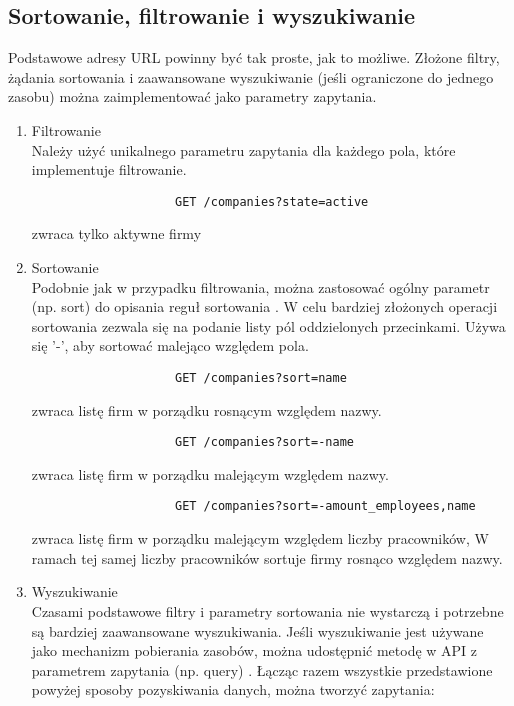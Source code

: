 	\subsection{Sortowanie, filtrowanie i wyszukiwanie}
		Podstawowe adresy URL powinny być tak proste, jak to możliwe. Złożone filtry, żądania sortowania i zaawansowane wyszukiwanie (jeśli ograniczone do jednego zasobu) można zaimplementować jako parametry zapytania.
		\begin{enumerate}
			\item{Filtrowanie} \\
				Należy użyć unikalnego parametru zapytania dla każdego pola, które implementuje filtrowanie.
				
				\begin{verbatim}
					GET /companies?state=active 
				\end{verbatim}
				zwraca tylko aktywne firmy
				
			
			\item{Sortowanie} \\
				Podobnie jak w przypadku filtrowania, można zastosować ogólny parametr (np. sort) do opisania reguł sortowania \cite{BestPracticesWeb}. W celu bardziej złożonych operacji sortowania zezwala się na podanie listy pól oddzielonych przecinkami. Używa się '-', aby sortować malejąco względem pola.
				
				\begin{verbatim}
					GET /companies?sort=name
				\end{verbatim}
				zwraca listę firm w porządku rosnącym względem nazwy. \\
				
				\begin{verbatim}
					GET /companies?sort=-name
				\end{verbatim}
				zwraca listę firm w porządku malejącym względem nazwy. \\
			
				\begin{verbatim}
					GET /companies?sort=-amount_employees,name
				\end{verbatim}
				zwraca listę firm w porządku malejącym względem liczby pracowników, W ramach tej samej liczby pracowników sortuje firmy rosnąco względem nazwy.
					
			\item{Wyszukiwanie} \\
				Czasami podstawowe filtry i parametry sortowania nie wystarczą i potrzebne są bardziej zaawansowane wyszukiwania. Jeśli wyszukiwanie jest używane jako mechanizm pobierania zasobów, można udostępnić metodę w API z parametrem zapytania (np. query) \cite{BestPracticesWeb}. Łącząc razem wszystkie przedstawione powyżej sposoby pozyskiwania danych, można tworzyć zapytania:
				

\end{enumerate}
